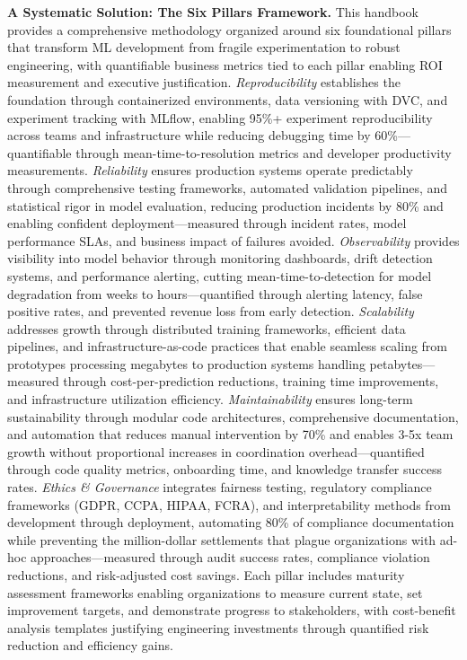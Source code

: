 \documentclass[11pt]{book}
\begin{document}
\textbf{A Systematic Solution: The Six Pillars Framework.} This handbook provides a comprehensive methodology organized around six foundational pillars that transform ML development from fragile experimentation to robust engineering, with quantifiable business metrics tied to each pillar enabling ROI measurement and executive justification. \textit{Reproducibility} establishes the foundation through containerized environments, data versioning with DVC, and experiment tracking with MLflow, enabling 95\%+ experiment reproducibility across teams and infrastructure while reducing debugging time by 60\%—quantifiable through mean-time-to-resolution metrics and developer productivity measurements. \textit{Reliability} ensures production systems operate predictably through comprehensive testing frameworks, automated validation pipelines, and statistical rigor in model evaluation, reducing production incidents by 80\% and enabling confident deployment—measured through incident rates, model performance SLAs, and business impact of failures avoided. \textit{Observability} provides visibility into model behavior through monitoring dashboards, drift detection systems, and performance alerting, cutting mean-time-to-detection for model degradation from weeks to hours—quantified through alerting latency, false positive rates, and prevented revenue loss from early detection. \textit{Scalability} addresses growth through distributed training frameworks, efficient data pipelines, and infrastructure-as-code practices that enable seamless scaling from prototypes processing megabytes to production systems handling petabytes—measured through cost-per-prediction reductions, training time improvements, and infrastructure utilization efficiency. \textit{Maintainability} ensures long-term sustainability through modular code architectures, comprehensive documentation, and automation that reduces manual intervention by 70\% and enables 3-5x team growth without proportional increases in coordination overhead—quantified through code quality metrics, onboarding time, and knowledge transfer success rates. \textit{Ethics \& Governance} integrates fairness testing, regulatory compliance frameworks (GDPR, CCPA, HIPAA, FCRA), and interpretability methods from development through deployment, automating 80\% of compliance documentation while preventing the million-dollar settlements that plague organizations with ad-hoc approaches—measured through audit success rates, compliance violation reductions, and risk-adjusted cost savings. Each pillar includes maturity assessment frameworks enabling organizations to measure current state, set improvement targets, and demonstrate progress to stakeholders, with cost-benefit analysis templates justifying engineering investments through quantified risk reduction and efficiency gains.
\end{document}
